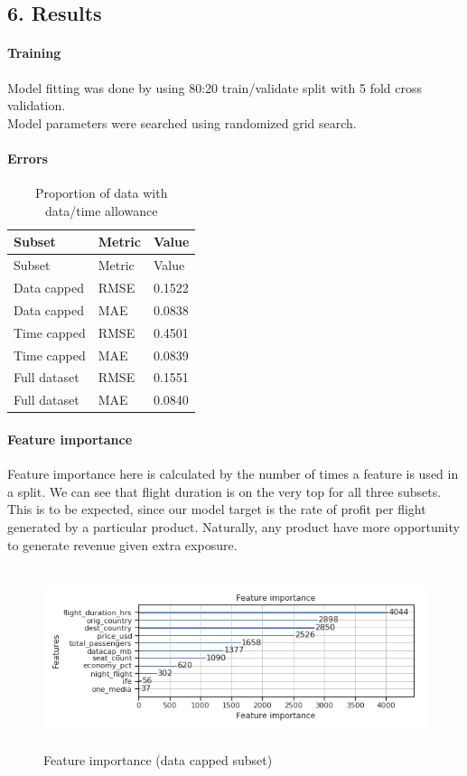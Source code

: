 \documentclass[]{article}
\let\oldparagraph\paragraph
\renewcommand{\paragraph}[1]{\oldparagraph{#1}\mbox{}}
\begin{document}
\hypertarget{results}{%
\subsection{6. Results}\label{results}}

\hypertarget{training}{%
\paragraph{Training}\label{training}}

Model fitting was done by using 80:20 train/validate split with 5 fold
cross validation.\\
Model parameters were searched using randomized grid search.

\hypertarget{errors}{%
\paragraph{Errors}\label{errors}}

\begin{longtable}[]{@{}lll@{}}
\caption{Proportion of data with data/time allowance}\tabularnewline
\toprule
Subset & Metric & Value\tabularnewline
\midrule
\endfirsthead
\toprule
Subset & Metric & Value\tabularnewline
\midrule
\endhead
Data capped & RMSE & 0.1522\tabularnewline
Data capped & MAE & 0.0838\tabularnewline
Time capped & RMSE & 0.4501\tabularnewline
Time capped & MAE & 0.0839\tabularnewline
Full dataset & RMSE & 0.1551\tabularnewline
Full dataset & MAE & 0.0840\tabularnewline
\bottomrule
\end{longtable}

\hypertarget{feature-importance}{%
\paragraph{Feature importance}\label{feature-importance}}

Feature importance here is calculated by the number of times a feature
is used in a split. We can see that flight duration is on the very top
for all three subsets. This is to be expected, since our model target is
the rate of profit per flight generated by a particular product.
Naturally, any product have more opportunity to generate revenue given
extra exposure.

\pagebreak

\begin{figure}
\centering
\includegraphics[width=\textwidth,height=2.08333in]{figures/featimp_dc.png}
\caption{Feature importance (data capped subset)}
\end{figure}
\end{document}
